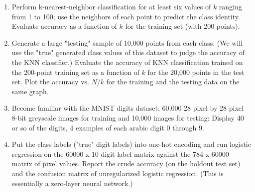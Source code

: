 \documentclass[12pt]{book}
\theoremstyle{definition}
\begin{document}
\begin{enumerate}
\item
Perform k-nearest-neighbor classification for at least six values of $k$ ranging from 1 to 100; use the neighbors of each point to predict the class identity.  Evaluate accuracy as a function of $k$ for the training set (with 200 points).

\item
Generate a large "testing" sample of 10,000 points from each class.  (We will use the "true" generated class values of this dataset to judge the accuracy of the KNN classifier.)
Evaluate the accuracy of KNN classification trained on the 200-point training set as a function of $k$ for the 20,000 points in the test set.  Plot the accuracy vs. $N/k$ for the training and the testing data on the same graph.   

\item
Become familiar with the MNIST digits dataset; 60,000 28 pixel by 28 pixel 8-bit greyscale images for training and 10,000 images for testing:  Display 40 or so of the digits, 4 examples of each arabic digit 0 through 9. 

\item 
Put the class labels ("true" digit labels) into one-hot encoding and run logistic regression on the 60000 x 10 digit label matrix against the 784 x 60000 matrix of pixel values.
Report the crude accuracy (on the holdout test set) and the confusion matrix of unregularized logistic regression.  (This is essentially a zero-layer neural network.)






\end{enumerate}
\end{document}
